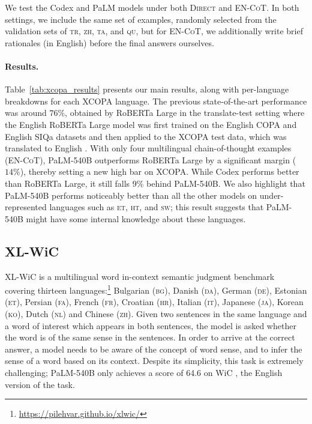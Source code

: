 We test the Codex and PaLM models under both \textsc{Direct} and \textsc{EN-CoT}. In both settings, we include the same set of examples, randomly selected from the validation sets of \textsc{tr}, \textsc{zh}, \textsc{ta}, and \textsc{qu}, but for \textsc{EN-CoT}, we additionally write brief rationales (in English) before the final answers ourselves. 

\paragraph{Results.} 

Table~\ref{tab:xcopa_results} presents our main results, along with per-language breakdowns for each {XCOPA} language. The previous state-of-the-art performance was around $76\%$, obtained by RoBERTa Large in the translate-test setting where the English RoBERTa Large model was first trained on the English COPA \citep{gordon-etal-2012-semeval} and English SIQa \citep{sap-etal-2019-social} datasets and then applied to the XCOPA test data, which was translated to English \citep{ponti-etal-2020-xcopa}. With only four multilingual chain-of-thought examples (\textsc{EN-CoT}), PaLM-540B outperforms RoBERTa Large by a significant margin ($14\%$), thereby setting a new high bar on {XCOPA}. While Codex performs better than RoBERTa Large, it still falls $9\%$ behind PaLM-540B. We also highlight that PaLM-540B performs noticeably better than all the other models on under-represented languages such as \textsc{et}, \textsc{ht}, and \textsc{sw}; this result suggests that PaLM-540B might have some internal knowledge about these languages.

\subsection{XL-WiC}
\label{sec:results-xlwic}

{XL-WiC} is a multilingual word in-context semantic judgment benchmark covering thirteen languages:\footnote{\url{https://pilehvar.github.io/xlwic/}} Bulgarian (\textsc{bg}), Danish (\textsc{da}), German (\textsc{de}), Estonian (\textsc{et}), Persian (\textsc{fa}), French (\textsc{fr}), Croatian (\textsc{hr}), Italian (\textsc{it}), Japanese (\textsc{ja}), Korean (\textsc{ko}), Dutch (\textsc{nl}) and Chinese (\textsc{zh}). 
Given two sentences in the same language and a word of interest which appears in both sentences, the model is asked whether the word is of the same sense in the sentences. In order to arrive at the correct answer, a model needs to be aware of the concept of word sense, and to infer the sense of a word based on its context. Despite its simplicity, this task is extremely challenging; PaLM-540B only achieves a score of 64.6 on WiC \citep{pilehvar-camacho-collados-2019-wic}, the English version of the task.

